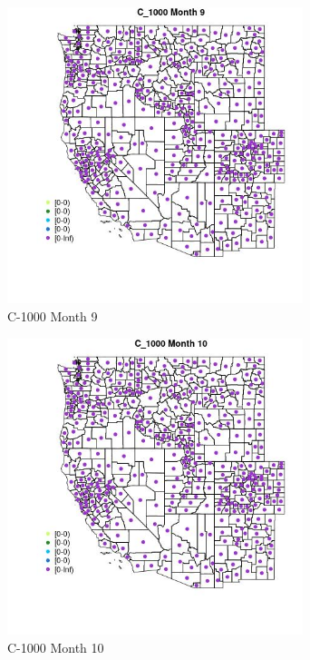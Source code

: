 \begin{figure} 
\centering  
\includegraphics[width=0.77\textwidth]{Code_Outputs/df_report_ML_predictors_CountyCentroid_Locations_Dates_2008-01-01to2018-12-31_MapObsMo9C_1000.jpg} 
\caption{\label{fig:df_report_ML_predictors_CountyCentroid_Locations_Dates_2008-01-01to2018-12-31MapObsMo9C_1000}C-1000 Month 9} 
\end{figure} 
 

\begin{figure} 
\centering  
\includegraphics[width=0.77\textwidth]{Code_Outputs/df_report_ML_predictors_CountyCentroid_Locations_Dates_2008-01-01to2018-12-31_MapObsMo10C_1000.jpg} 
\caption{\label{fig:df_report_ML_predictors_CountyCentroid_Locations_Dates_2008-01-01to2018-12-31MapObsMo10C_1000}C-1000 Month 10} 
\end{figure} 
 


